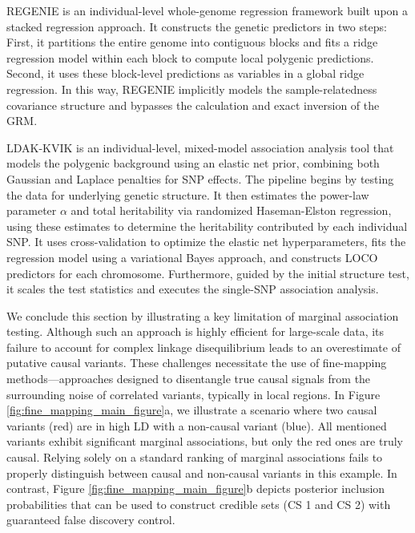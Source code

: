 REGENIE is an individual-level whole-genome regression framework built upon a stacked regression approach. It constructs the genetic predictors in two steps: First, it partitions the entire genome into contiguous blocks and fits a ridge regression model within each block to compute local polygenic predictions. Second, it uses these block-level predictions as variables in a global ridge regression. In this way, REGENIE implicitly models the sample-relatedness covariance structure and bypasses the calculation and exact inversion of the GRM. 

LDAK-KVIK is an individual-level, mixed-model association analysis tool that models the polygenic background using an elastic net prior, combining both Gaussian and Laplace penalties for SNP effects. The pipeline begins by testing the data for underlying genetic structure. It then estimates the power-law parameter $\alpha$ and total heritability via randomized Haseman-Elston regression, using these estimates to determine the heritability contributed by each individual SNP. It uses cross-validation to optimize the elastic net hyperparameters, fits the regression model using a variational Bayes approach, and constructs LOCO predictors for each chromosome. Furthermore, guided by the initial structure test, it scales the test statistics and executes the single-SNP association analysis.

We conclude this section by illustrating a key limitation of marginal association testing. Although such an approach is highly efficient for large-scale data, its failure to account for complex linkage disequilibrium leads to an overestimate of putative causal variants. These challenges necessitate the use of fine-mapping methods---approaches designed to disentangle true causal signals from the surrounding noise of correlated variants, typically in local regions. In Figure \ref{fig:fine_mapping_main_figure}a, we illustrate a scenario where two causal variants (red) are in high LD with a non-causal variant (blue). All mentioned variants exhibit significant marginal associations, but only the red ones are truly causal. Relying solely on a standard ranking of marginal associations fails to properly distinguish between causal and non-causal variants in this example. In contrast, Figure \ref{fig:fine_mapping_main_figure}b depicts posterior inclusion probabilities that can be used to construct credible sets (CS 1 and CS 2) with guaranteed false discovery control. 


